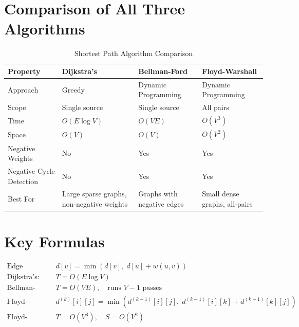 \documentclass[12pt,a4paper]{article}
\begin{document}
\newpage

\section{Comparison of All Three Algorithms}

\begin{table}[h!]
\centering
\renewcommand{\arraystretch}{1.5}
\begin{tabular}{|l|p{3.5cm}|p{3.5cm}|p{3.5cm}|}
\hline
\textbf{Property}    & \textbf{Dijkstra's}       & \textbf{Bellman-Ford}       & \textbf{Floyd-Warshall}    \\
\hline
Approach             & Greedy                    & Dynamic Programming         & Dynamic Programming         \\
Scope                & Single source             & Single source               & All pairs                   \\
Time                 & $O(E \log V)$             & $O(VE)$                     & $O(V^3)$                    \\
Space                & $O(V)$                    & $O(V)$                      & $O(V^2)$                    \\
Negative Weights     & \textcolor{negativered}{No}    & \textcolor{codegreen}{Yes} & \textcolor{codegreen}{Yes} \\
Negative Cycle Detection & No                   & \textcolor{codegreen}{Yes}  & \textcolor{codegreen}{Yes} \\
Best For             & Large sparse graphs, non-negative weights & Graphs with negative edges & Small dense graphs, all-pairs \\
\hline
\end{tabular}
\caption{Shortest Path Algorithm Comparison}
\end{table}

\section{Key Formulas}

\begin{align}
\text{Edge Relaxation:}\quad         & d[v] = \min(d[v],\; d[u] + w(u,v)) \\[4pt]
\text{Dijkstra's:}\quad              & T = O(E \log V) \\[4pt]
\text{Bellman-Ford:}\quad            & T = O(VE),\quad \text{runs } V-1 \text{ passes} \\[4pt]
\text{Floyd-Warshall DP:}\quad       & d^{(k)}[i][j] = \min\!\left(d^{(k-1)}[i][j],\;d^{(k-1)}[i][k]+d^{(k-1)}[k][j]\right) \\[4pt]
\text{Floyd-Warshall:}\quad          & T = O(V^3),\quad S = O(V^2)
\end{align}
\end{document}
